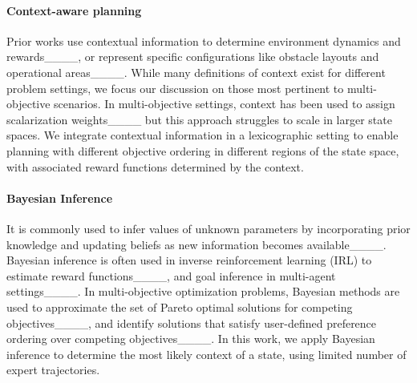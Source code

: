\paragraph{Context-aware planning} 
Prior works use contextual information to determine environment dynamics and rewards____, or represent specific configurations like obstacle layouts and operational areas____. While many definitions of context exist for different problem settings, we focus our discussion on those most pertinent to multi-objective scenarios. In multi-objective settings, context has been used to assign scalarization weights____ but this approach struggles to scale in larger state spaces. We integrate contextual information in a lexicographic setting to enable planning with different objective ordering in different regions of the state space, with associated reward functions determined by the context. 

\paragraph{Bayesian Inference} It is commonly used to infer values of unknown parameters by incorporating prior knowledge and updating beliefs as new information becomes available____.
Bayesian inference is often used in 
inverse reinforcement learning (IRL) to estimate reward functions____, and goal inference in multi-agent settings____. In multi-objective optimization problems, Bayesian methods are used to approximate the set of Pareto optimal solutions for competing objectives____, and identify solutions that satisfy user-defined preference ordering over competing objectives____.
In this work, we apply Bayesian inference to determine the most likely context of a state, using limited number of expert trajectories.

